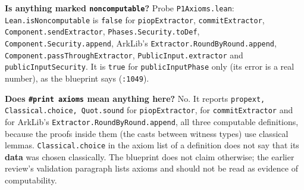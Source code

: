 \textbf{Is anything marked \texttt{noncomputable}?} Probe \texttt{P1Axioms.\allowbreak{}lean}: \texttt{Lean.\allowbreak{}isNoncomputable} is \texttt{false} for \texttt{piopExtractor}, \texttt{commitExtractor}, \texttt{Component.\allowbreak{}sendExtractor}, \texttt{Phases.\allowbreak{}Security.\allowbreak{}toDef}, \texttt{Component.\allowbreak{}Security.\allowbreak{}append}, ArkLib's \texttt{E\allowbreak{}x\allowbreak{}t\allowbreak{}r\allowbreak{}a\allowbreak{}c\allowbreak{}t\allowbreak{}o\allowbreak{}r\allowbreak{}.\allowbreak{}R\allowbreak{}o\allowbreak{}u\allowbreak{}n\allowbreak{}d\allowbreak{}B\allowbreak{}y\allowbreak{}R\allowbreak{}o\allowbreak{}u\allowbreak{}n\allowbreak{}d\allowbreak{}.\allowbreak{}a\allowbreak{}p\allowbreak{}p\allowbreak{}e\allowbreak{}n\allowbreak{}d}, \texttt{C\allowbreak{}o\allowbreak{}m\allowbreak{}p\allowbreak{}o\allowbreak{}n\allowbreak{}e\allowbreak{}n\allowbreak{}t\allowbreak{}.\allowbreak{}p\allowbreak{}a\allowbreak{}s\allowbreak{}s\allowbreak{}T\allowbreak{}h\allowbreak{}r\allowbreak{}o\allowbreak{}u\allowbreak{}g\allowbreak{}h\allowbreak{}E\allowbreak{}x\allowbreak{}t\allowbreak{}r\allowbreak{}a\allowbreak{}c\allowbreak{}t\allowbreak{}o\allowbreak{}r}, \texttt{PublicInput.\allowbreak{}extractor} and \texttt{publicInputSecurity}. It is \texttt{true} for \texttt{publicInputPhase} only (its error is a real number), as the blueprint says (\texttt{:1049}).

\textbf{Does \texttt{\#print axioms} mean anything here?} No. It reports \texttt{p\allowbreak{}r\allowbreak{}o\allowbreak{}p\allowbreak{}e\allowbreak{}x\allowbreak{}t\allowbreak{},\allowbreak{} C\allowbreak{}l\allowbreak{}a\allowbreak{}s\allowbreak{}s\allowbreak{}i\allowbreak{}c\allowbreak{}a\allowbreak{}l\allowbreak{}.\allowbreak{}c\allowbreak{}h\allowbreak{}o\allowbreak{}i\allowbreak{}c\allowbreak{}e\allowbreak{},\allowbreak{} Q\allowbreak{}u\allowbreak{}o\allowbreak{}t\allowbreak{}.\allowbreak{}s\allowbreak{}o\allowbreak{}u\allowbreak{}n\allowbreak{}d} for \texttt{piopExtractor}, for \texttt{commitExtractor} and for ArkLib's \texttt{E\allowbreak{}x\allowbreak{}t\allowbreak{}r\allowbreak{}a\allowbreak{}c\allowbreak{}t\allowbreak{}o\allowbreak{}r\allowbreak{}.\allowbreak{}R\allowbreak{}o\allowbreak{}u\allowbreak{}n\allowbreak{}d\allowbreak{}B\allowbreak{}y\allowbreak{}R\allowbreak{}o\allowbreak{}u\allowbreak{}n\allowbreak{}d\allowbreak{}.\allowbreak{}a\allowbreak{}p\allowbreak{}p\allowbreak{}e\allowbreak{}n\allowbreak{}d}, all three computable definitions, because the proofs inside them (the casts between witness types) use classical lemmas. \texttt{Classical.\allowbreak{}choice} in the axiom list of a definition does not say that its \textbf{data} was chosen classically. The blueprint does not claim otherwise; the earlier review's validation paragraph lists axioms and should not be read as evidence of computability.

